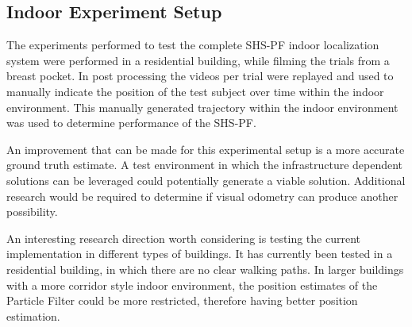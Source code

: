 \subsection{Indoor Experiment Setup}

The experiments performed to test the complete SHS-PF indoor localization system were performed in a residential building, while filming the trials from a breast pocket. In post processing the videos per trial were replayed and used to manually indicate the position of the test subject over time within the indoor environment. This manually generated trajectory within the indoor environment was used to determine performance of the SHS-PF. \par 

An improvement that can be made for this experimental setup is a more accurate ground truth estimate. A test environment in which the infrastructure dependent solutions can be leveraged could potentially generate a viable solution. Additional research would be required to determine if visual odometry can produce another possibility. \par

An interesting research direction worth considering is testing the current implementation in different types of buildings. It has currently been tested in a residential building, in which there are no clear walking paths. In larger buildings with a more corridor style indoor environment, the position estimates of the Particle Filter could be more restricted, therefore having better position estimation.
